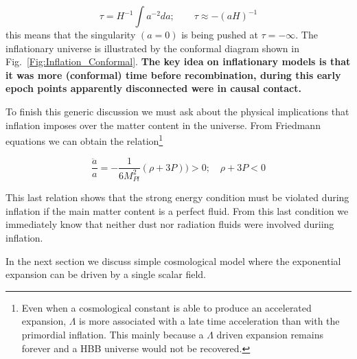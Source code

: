 \documentclass[12pt,letterpaper,twoside]{book}
\begin{document}
\begin{equation}
\tau = H^{-1}\int a^{-2}da;  \qquad \tau \approx -\left(aH\right)^{-1}
\end{equation}
this means that the singularity $(a=0)$ is being pushed at $\tau= -\infty$. The
inflationary universe is illustrated by the conformal diagram shown in
Fig.~\ref{Fig:Inflation_Conformal}. \textbf{The key idea on inflationary models
    is that it was more (conformal) time before recombination, during this early
    epoch points apparently disconnected were in causal contact. }


To finish this generic discussion we must ask about the physical
implications that inflation imposes over the matter content in the universe.
From Friedmann equations we can obtain the relation\footnote{Even when a
    cosmological constant is able to produce an accelerated expansion, $\Lambda$
    is more associated with a late time acceleration than with the
    primordial inflation. This mainly because a $\Lambda$ driven expansion
    remains forever and a HBB universe would not be recovered.}

\begin{equation}
    \frac{\ddot{a}}{a} = -\frac{1}{6{M_{Pl}^2}}\left( \rho +3P \right)) > 0;
    \quad \rho + 3P  < 0
\end{equation}

This last relation shows that the strong energy condition must be violated
during inflation if the main matter content is a perfect fluid. From this last
condition we immediately know that neither dust nor radiation fluids were
involved duriing inflation.

In the next section we discuss simple cosmological model where the exponential
expansion can be driven by a single scalar field.





\end{document}
